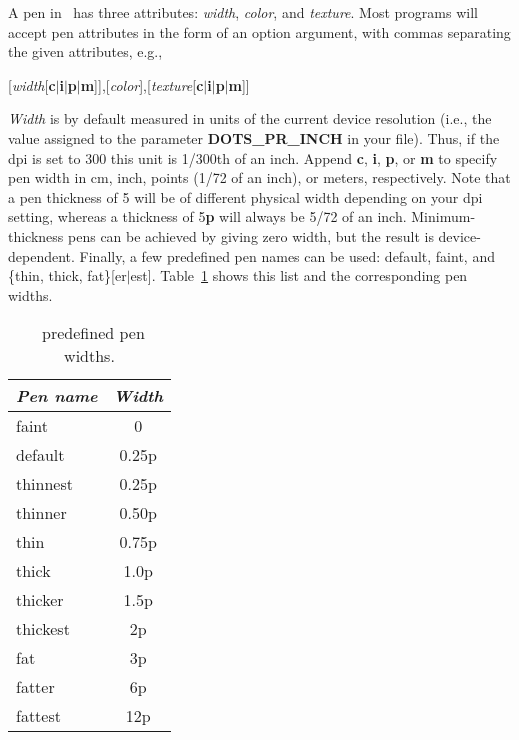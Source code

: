 %
%
\label{sec:pen}
A pen in \GMT\ has three attributes: {\it width}, {\it color},
and {\it texture}.  Most programs will accept pen attributes in
the form of an option argument, with commas separating the
given attributes, e.g.,

\vspace{\baselineskip} 

\par {}[{\it width}[{\bf c$|$i$|$p$|$m}]],[{\it color}],[{\it texture}[{\bf c$|$i$|$p$|$m}]]\par 

\begin{description}
%
\item[$\rightarrow$]{\it Width} is by default measured in units of the
current device resolution (i.e., the value assigned to the parameter
{\bf DOTS\_PR\_INCH} in your  file).  Thus, if the
dpi is set to 300 this unit is 1/300th of an inch.  Append {\bf c},
{\bf i}, {\bf p}, or {\bf m} to specify pen width in cm, inch, points
(1/72 of an inch), or meters, respectively.
Note that a pen thickness of 5 will be of different physical width
depending on your dpi setting, whereas a thickness of 5{\bf p} will
always be 5/72 of an inch.  Minimum-thickness pens can be achieved by
giving zero width, but the result is device-dependent.  Finally, a few
predefined pen names can be used: default, faint, and \{thin, thick, fat\}[er$|$est].
Table~\ref{tbl:pennames} shows this list and the corresponding pen widths.
\begin{table}[h]
\centering
\begin{tabular}{|l|c|} \hline
\multicolumn{1}{|c|}{\emph{Pen name}}	&	\multicolumn{1}{c|}{\emph{Width}} \\ \hline
faint		&	0 \\ \hline 
default		&	0.25p \\ \hline 
thinnest	&	0.25p \\ \hline 
thinner		&	0.50p \\ \hline 
thin		&	0.75p \\ \hline 
thick		&	1.0p \\ \hline 
thicker		&	1.5p \\ \hline 
thickest	&	2p \\ \hline 
fat		&	3p \\ \hline 
fatter		&	6p \\ \hline 
fattest		&	12p \\ \hline 
\end{tabular}
\caption{\gmt\ predefined pen widths.}
\label{tbl:pennames}
\end{table}


\end{description}
